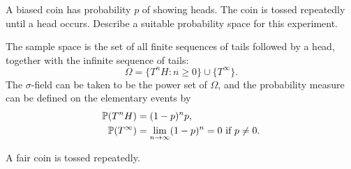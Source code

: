 \begin{exercise}
\begin{questions}
\question A biased coin has probability $p$ of showing heads. The coin is tossed repeatedly until a head occurs. Describe a suitable probability space for this experiment.
\begin{answer}
The sample space is the set of all finite sequences of tails followed by a head, together with the infinite sequence of tails:
\[
\Omega = \{T^nH:n\geq 0\} \cup \{T^{\infty}\}.
\]
The $\sigma$-field can be taken to be the power set of $\Omega$, and the probability measure can be defined on the elementary events by
\begin{align*}
\mathbb{P}(T^nH) 			& = (1-p)^n p, \\
\mathbb{P}(T^{\infty})	& = \lim_{n\to\infty}(1-p)^n = 0 \text{ if } p\neq 0.
\end{align*}
\end{answer}
\question
A fair coin is tossed repeatedly.
\end{questions}
\end{exercise}
